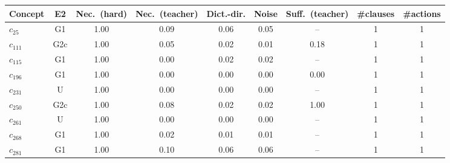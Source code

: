 \begin{tabular}{lcccccccc}
\toprule
Concept & E2 & Nec.\ (hard) & Nec.\ (teacher) & Dict.-dir. & Noise & Suff.\ (teacher) & \#clauses & \#actions \\
\midrule
$c_{25}$ & G1 & 1.00 & 0.09 & 0.06 & 0.05 & -- & 1 & 1 \\
$c_{111}$ & G2c & 1.00 & 0.05 & 0.02 & 0.01 & 0.18 & 1 & 1 \\
$c_{115}$ & G1 & 1.00 & 0.00 & 0.02 & 0.02 & -- & 1 & 1 \\
$c_{196}$ & G1 & 1.00 & 0.00 & 0.00 & 0.00 & 0.00 & 1 & 1 \\
$c_{231}$ & U & 1.00 & 0.00 & 0.00 & 0.00 & -- & 1 & 1 \\
$c_{250}$ & G2c & 1.00 & 0.08 & 0.02 & 0.02 & 1.00 & 1 & 1 \\
$c_{261}$ & U & 1.00 & 0.00 & 0.00 & 0.00 & -- & 1 & 1 \\
$c_{268}$ & G1 & 1.00 & 0.02 & 0.01 & 0.01 & -- & 1 & 1 \\
$c_{281}$ & G1 & 1.00 & 0.10 & 0.06 & 0.06 & -- & 1 & 1 \\
\bottomrule
\end{tabular}
